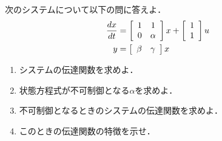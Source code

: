 \item
次のシステムについて以下の問に答えよ．
\begin{align}
	\frac{dx}{dt}
	&=	\bmatrix{cc}
			1 & 1 \\
			0 & \alpha
		\ematrix
		x
		+
		\bmatrix{c}
			1 \\
			1 
		\ematrix
		u
\nonumber \\
	y 
	&=	\bmatrix{cc}
			\beta & \gamma 
		\ematrix
		x
\nonumber 
\end{align}

\begin{enumerate}

\item 
システムの伝達関数を求めよ．
\vspace{6cm}

\item
状態方程式が不可制御となる$\alpha$を求めよ．
\vspace{6cm}

\item
不可制御となるときのシステムの伝達関数を求めよ．
\vspace{6cm}

\item
このときの伝達関数の特徴を示せ．

\end{enumerate}
